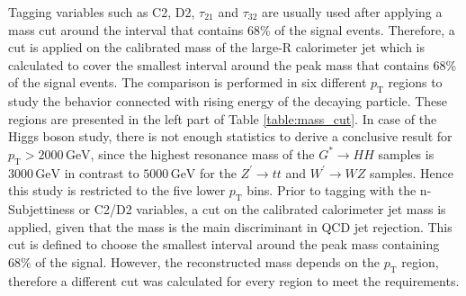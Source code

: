 Tagging variables such as C2, D2, $\tau_{21}$ and $\tau_{32}$ are usually used after applying a mass cut around the interval that contains 68\% of the signal events. Therefore, a cut is applied on the calibrated mass of the large-R calorimeter jet which is calculated to cover the smallest interval around the peak mass that contains 68\% of the signal events.
The comparison is performed in six different $p_{\mathrm{T}}$ regions to study the behavior connected with rising energy of the decaying particle. These regions are presented in the left part of Table \ref{table:mass_cut}. 
In case of the Higgs boson study, there is not enough statistics to derive a conclusive result for $p_{\mathrm{T}} > 2000 \, \text{GeV}$, since the highest resonance mass of the $G^* \rightarrow HH$ samples is $3000 \, \text{GeV}$ in contrast to $5000 \, \text{GeV}$ for the $Z^\prime \rightarrow tt$ and $W^\prime \rightarrow WZ$ samples. Hence this study is restricted to the five lower $p_{\mathrm{T}}$ bins.
Prior to tagging with the n-Subjettiness or C2/D2 variables, a cut on the calibrated calorimeter jet mass is applied, given that the mass is the main discriminant in QCD jet rejection. This cut is defined to choose the smallest interval around the peak mass containing 68\% of the signal. However, the reconstructed mass depends on the $p_{\mathrm{T}}$ region, therefore a different cut was calculated for every region to meet the requirements.

